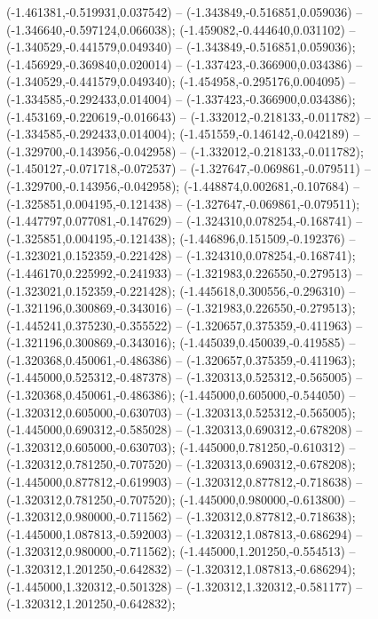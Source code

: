  (-1.461381,-0.519931,0.037542) -- (-1.343849,-0.516851,0.059036) -- (-1.346640,-0.597124,0.066038);
 (-1.459082,-0.444640,0.031102) -- (-1.340529,-0.441579,0.049340) -- (-1.343849,-0.516851,0.059036);
 (-1.456929,-0.369840,0.020014) -- (-1.337423,-0.366900,0.034386) -- (-1.340529,-0.441579,0.049340);
 (-1.454958,-0.295176,0.004095) -- (-1.334585,-0.292433,0.014004) -- (-1.337423,-0.366900,0.034386);
 (-1.453169,-0.220619,-0.016643) -- (-1.332012,-0.218133,-0.011782) -- (-1.334585,-0.292433,0.014004);
 (-1.451559,-0.146142,-0.042189) -- (-1.329700,-0.143956,-0.042958) -- (-1.332012,-0.218133,-0.011782);
 (-1.450127,-0.071718,-0.072537) -- (-1.327647,-0.069861,-0.079511) -- (-1.329700,-0.143956,-0.042958);
 (-1.448874,0.002681,-0.107684) -- (-1.325851,0.004195,-0.121438) -- (-1.327647,-0.069861,-0.079511);
 (-1.447797,0.077081,-0.147629) -- (-1.324310,0.078254,-0.168741) -- (-1.325851,0.004195,-0.121438);
 (-1.446896,0.151509,-0.192376) -- (-1.323021,0.152359,-0.221428) -- (-1.324310,0.078254,-0.168741);
 (-1.446170,0.225992,-0.241933) -- (-1.321983,0.226550,-0.279513) -- (-1.323021,0.152359,-0.221428);
 (-1.445618,0.300556,-0.296310) -- (-1.321196,0.300869,-0.343016) -- (-1.321983,0.226550,-0.279513);
 (-1.445241,0.375230,-0.355522) -- (-1.320657,0.375359,-0.411963) -- (-1.321196,0.300869,-0.343016);
 (-1.445039,0.450039,-0.419585) -- (-1.320368,0.450061,-0.486386) -- (-1.320657,0.375359,-0.411963);
 (-1.445000,0.525312,-0.487378) -- (-1.320313,0.525312,-0.565005) -- (-1.320368,0.450061,-0.486386);
 (-1.445000,0.605000,-0.544050) -- (-1.320312,0.605000,-0.630703) -- (-1.320313,0.525312,-0.565005);
 (-1.445000,0.690312,-0.585028) -- (-1.320313,0.690312,-0.678208) -- (-1.320312,0.605000,-0.630703);
 (-1.445000,0.781250,-0.610312) -- (-1.320312,0.781250,-0.707520) -- (-1.320313,0.690312,-0.678208);
 (-1.445000,0.877812,-0.619903) -- (-1.320312,0.877812,-0.718638) -- (-1.320312,0.781250,-0.707520);
 (-1.445000,0.980000,-0.613800) -- (-1.320312,0.980000,-0.711562) -- (-1.320312,0.877812,-0.718638);
 (-1.445000,1.087813,-0.592003) -- (-1.320312,1.087813,-0.686294) -- (-1.320312,0.980000,-0.711562);
 (-1.445000,1.201250,-0.554513) -- (-1.320312,1.201250,-0.642832) -- (-1.320312,1.087813,-0.686294);
 (-1.445000,1.320312,-0.501328) -- (-1.320312,1.320312,-0.581177) -- (-1.320312,1.201250,-0.642832);

